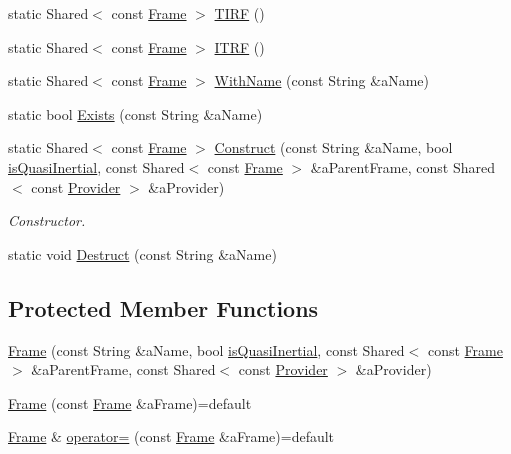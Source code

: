 \begin{DoxyCompactItemize}
\item 
static Shared$<$ const \hyperlink{classostk_1_1physics_1_1coord_1_1_frame}{Frame} $>$ \hyperlink{classostk_1_1physics_1_1coord_1_1_frame_ac159b1d21bc5f55e7163d27f4cc25c34}{T\+I\+RF} ()
\item 
static Shared$<$ const \hyperlink{classostk_1_1physics_1_1coord_1_1_frame}{Frame} $>$ \hyperlink{classostk_1_1physics_1_1coord_1_1_frame_ac1d0d50dc15982fbef3caba62a9ed507}{I\+T\+RF} ()
\item 
static Shared$<$ const \hyperlink{classostk_1_1physics_1_1coord_1_1_frame}{Frame} $>$ \hyperlink{classostk_1_1physics_1_1coord_1_1_frame_ad9f12f000a68daaec4969ba739f43ee7}{With\+Name} (const String \&a\+Name)
\item 
static bool \hyperlink{classostk_1_1physics_1_1coord_1_1_frame_afe14b695035c704b408563a12a47eb38}{Exists} (const String \&a\+Name)
\item 
static Shared$<$ const \hyperlink{classostk_1_1physics_1_1coord_1_1_frame}{Frame} $>$ \hyperlink{classostk_1_1physics_1_1coord_1_1_frame_a6faa8908c55e5e56ce3ed4c96d15b9af}{Construct} (const String \&a\+Name, bool \hyperlink{classostk_1_1physics_1_1coord_1_1_frame_ac0f7d78be14f09ccef5b862c4f963da8}{is\+Quasi\+Inertial}, const Shared$<$ const \hyperlink{classostk_1_1physics_1_1coord_1_1_frame}{Frame} $>$ \&a\+Parent\+Frame, const Shared$<$ const \hyperlink{classostk_1_1physics_1_1coord_1_1frame_1_1_provider}{Provider} $>$ \&a\+Provider)
\begin{DoxyCompactList}\small\item\em Constructor. \end{DoxyCompactList}\item 
static void \hyperlink{classostk_1_1physics_1_1coord_1_1_frame_a2c4bf16207b59862deaeee224153b8f9}{Destruct} (const String \&a\+Name)
\end{DoxyCompactItemize}
\subsection*{Protected Member Functions}
\begin{DoxyCompactItemize}
\item 
\hyperlink{classostk_1_1physics_1_1coord_1_1_frame_a66f32d0c9dd2497b6e7ace4fcccbce60}{Frame} (const String \&a\+Name, bool \hyperlink{classostk_1_1physics_1_1coord_1_1_frame_ac0f7d78be14f09ccef5b862c4f963da8}{is\+Quasi\+Inertial}, const Shared$<$ const \hyperlink{classostk_1_1physics_1_1coord_1_1_frame}{Frame} $>$ \&a\+Parent\+Frame, const Shared$<$ const \hyperlink{classostk_1_1physics_1_1coord_1_1frame_1_1_provider}{Provider} $>$ \&a\+Provider)
\item 
\hyperlink{classostk_1_1physics_1_1coord_1_1_frame_acaa7ddfcad1566838ca72bf431a3bd4f}{Frame} (const \hyperlink{classostk_1_1physics_1_1coord_1_1_frame}{Frame} \&a\+Frame)=default
\item 
\hyperlink{classostk_1_1physics_1_1coord_1_1_frame}{Frame} \& \hyperlink{classostk_1_1physics_1_1coord_1_1_frame_ac47e4fe942c8cd0b8969ee9f6d32b816}{operator=} (const \hyperlink{classostk_1_1physics_1_1coord_1_1_frame}{Frame} \&a\+Frame)=default
\end{DoxyCompactItemize}
